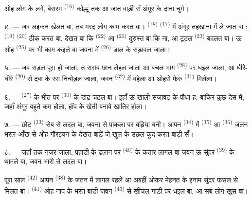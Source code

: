ओह लोग के लगे, बेसरम  \textsuperscript{(16)} कोल्हू तक आ
जात बाड़ी सँ अंगूर के दाना चुगे।

४. --- जब लइकन खेलत बा, तब मरद लोग काम करत बा।  \textsuperscript{(18)}  \textsuperscript{(17)} में
अंगूर तहखाना में ले जात बा ;  \textsuperscript{(19)}
 \textsuperscript{(20)} ठीक करत बा, देखत बा कि  \textsuperscript{(22)} आ  \textsuperscript{(21)}
दुरुस्त बा कि ना, आ टूटल  \textsuperscript{(23)} बदलत
बा। ऊ ओह  \textsuperscript{(25)} पर भी काम कइले बा जवना में
 \textsuperscript{(26)} डाल के सड़ावल जाला।

५. --- जब सड़ल पूरा हो जाला, त सराब छान लेहल जाला आ बचल भाग
 \textsuperscript{(28)} पर धइल जाला, आ धीरे-धीरे
 \textsuperscript{(29)} से दबा के रस निचोड़ल जाला, जवन
 \textsuperscript{(32)} में बहेला आ ओहसे फेरु 
\textsuperscript{(31)} मिलेला।

\VUsaut{6.0mm}
\VUsaut{3.4mm}

६. ---  \textsuperscript{(27)} के भीत पर  \textsuperscript{(30)} के डाढ़ चढ़ल बा। इहाँ ऊ खाली सजावट के पौधा ह,
बाकिर कुछ देस में, जहाँ अंगूर बहुते कम होला, हॉप के खेती 
बनावे खातिर होला।

७. --- छोट  \textsuperscript{(33)} सेब से लदल बा,
जवना से पाकला पर बढ़िया  बनी। आपन 
\textsuperscript{(34)} में  \textsuperscript{(35)} आ
 \textsuperscript{(36)} जलन भरल आँख से ओह गौरइयन के देखत
बाड़ें जे खुल के उछल-कूद करत बाड़ी सँ।

८. --- जहाँ तक नजर जाला, पहाड़ी के ढलान पर 
\textsuperscript{(40)} के कतार लागल बा जवन ऊ सुंदर 
\textsuperscript{(39)} के थामले बा, जवन भारी  से लदल बा।

पूरा साल  \textsuperscript{(42)} आपन  \textsuperscript{(38)} के जतन में लागल रहलें आ अबहीं ओकर मेहनत के
इनाम सुंदर फसल से मिलत बा। 
\textsuperscript{(41)} ओह नाद के भरत बाड़ी जवन 
\textsuperscript{(43)} से खींचल गाड़ी पर धइल बा, आ सब लोग खुस बा।

\VUsaut{5.0mm}
\VUsaut{3.4mm}

